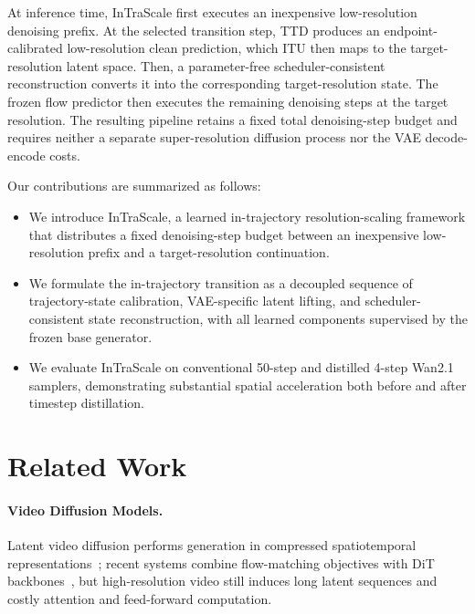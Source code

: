 \documentclass[letterpaper]{article} %
\begin{document}
At inference time, InTraScale first executes an inexpensive
low-resolution denoising prefix. At the selected transition step, TTD
produces an endpoint-calibrated low-resolution clean prediction, which
ITU then maps to the target-resolution latent space. Then, a parameter-free scheduler-consistent
reconstruction converts it into the corresponding target-resolution
state. The frozen flow predictor then
executes the remaining denoising steps at the target resolution. The
resulting pipeline retains a fixed total denoising-step budget and
requires neither a separate super-resolution diffusion process nor the
VAE decode-encode costs.


Our contributions are summarized as follows:
\begin{itemize}
  \item We introduce InTraScale, a learned in-trajectory resolution-scaling
  framework that distributes a fixed denoising-step budget between an
  inexpensive low-resolution prefix and a target-resolution continuation.

  \item We formulate the in-trajectory transition as a decoupled
sequence of trajectory-state calibration, VAE-specific latent lifting,
and scheduler-consistent state reconstruction, with all learned
components supervised by the frozen base generator.

  \item We evaluate InTraScale on conventional 50-step and distilled
  4-step Wan2.1 samplers, demonstrating substantial spatial
  acceleration both before and after timestep distillation.
\end{itemize}

\section{Related Work}

\paragraph{Video Diffusion Models.}
Latent video diffusion performs generation in compressed spatiotemporal
representations~\citep{blattmann2023videoldm}; recent systems combine
flow-matching objectives with DiT backbones~\citep{jin2025pyramidalflow,wan2025},
but high-resolution video still induces long latent sequences and costly
attention and feed-forward computation.
\end{document}
